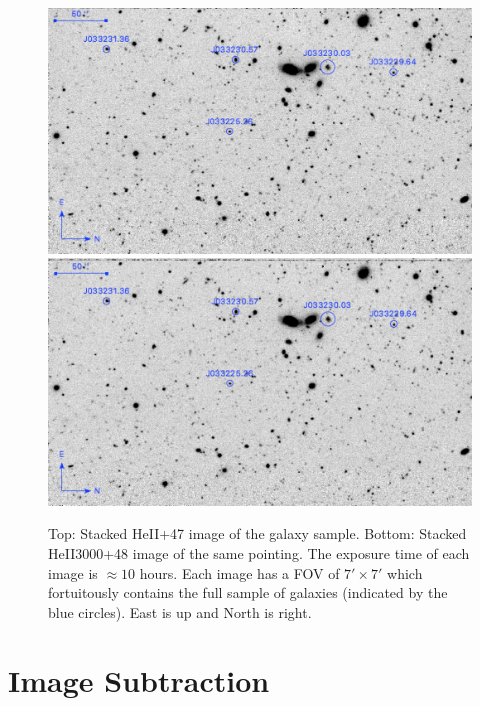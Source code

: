 \documentclass[twocolumn]{aastex61}
\begin{document}
\begin{figure}[ht!]
\centering
\includegraphics[scale=.61]{../Figures/HEII_final.png}
\includegraphics[scale=.61]{../Figures/HEII3000_final.png}
\caption{Top: Stacked HeII+47 image of the galaxy sample. Bottom: Stacked HeII3000+48 image of the same pointing. The exposure time of each image is $\approx 10$ hours. Each image has a FOV of $7' \times 7'$ which fortuitously contains the full sample of galaxies (indicated by the blue circles). East is up and North is right.
\label{fig:stacked_image}}
\end{figure}

\section{Image Subtraction}\label{sec.cont_sub}
\end{document}
